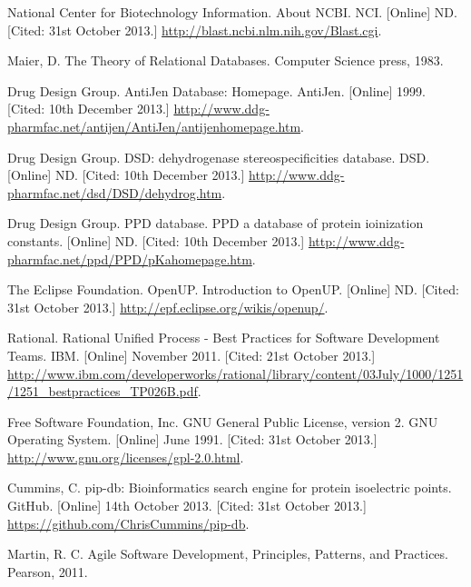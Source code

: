  National Center for Biotechnology Information. About
  NCBI. NCI. [Online] ND. [Cited: 31st October 2013.]
  \url{http://blast.ncbi.nlm.nih.gov/Blast.cgi}.

 Maier, D. The Theory of Relational Databases. Computer
  Science press, 1983.

 Drug Design Group. AntiJen Database:
  Homepage. AntiJen. [Online] 1999. [Cited: 10th December 2013.]
  \url{http://www.ddg-pharmfac.net/antijen/AntiJen/antijenhomepage.htm}.

 Drug Design Group. DSD: dehydrogenase stereospecificities
  database. DSD. [Online] ND. [Cited: 10th December 2013.]
  \url{http://www.ddg-pharmfac.net/dsd/DSD/dehydrog.htm}.

 Drug Design Group. PPD database. PPD a database of protein
  ioinization constants. [Online] ND. [Cited: 10th December 2013.]
  \url{http://www.ddg-pharmfac.net/ppd/PPD/pKahomepage.htm}.

 The Eclipse Foundation. OpenUP. Introduction to
  OpenUP. [Online] ND. [Cited: 31st October 2013.]
  \url{http://epf.eclipse.org/wikis/openup/}.

 Rational. Rational Unified Process - Best Practices for
  Software Development Teams. IBM. [Online] November 2011. [Cited: 21st October
    2013.]
  \url{http://www.ibm.com/developerworks/rational/library/content/03July/1000/1251/1251_bestpractices_TP026B.pdf}.

 Free Software Foundation, Inc. GNU General Public License,
  version 2. GNU Operating System. [Online] June 1991. [Cited: 31st October
    2013.] \url{http://www.gnu.org/licenses/gpl-2.0.html}.

 Cummins, C. pip-db: Bioinformatics search engine for
  protein isoelectric points. GitHub. [Online] 14th October 2013. [Cited: 31st
    October 2013.]  \url{https://github.com/ChrisCummins/pip-db}.

 Martin, R. C. Agile Software Development, Principles,
  Patterns, and Practices. Pearson, 2011.
